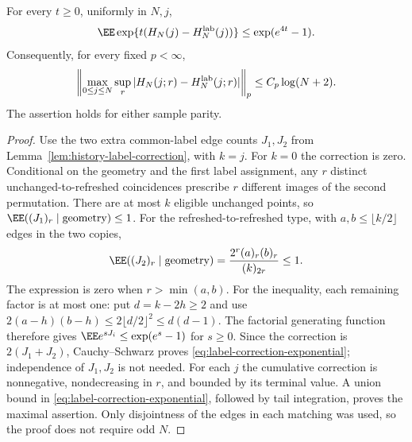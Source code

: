 \documentclass[11pt,letterpaper]{article}
\begin{document}
\begin{lemma}
\label{lem:label-correction-exponential}
For every $t\ge0$, uniformly in $N,j$,
\begin{equation}\label{eq:label-correction-exponential}
 \EE\exp\{t(H_N(j)-H_N^{\rm lab}(j))\}
                       \le \exp(e^{4t}-1).
\end{equation}
Consequently, for every fixed $p<\infty$,
\[
 \left\|\max_{0\le j\le N}\sup_r
       |H_N(j;r)-H_N^{\rm lab}(j;r)|\right\|_p
                              \le C_p\log(N+2).
\]
The assertion holds for either sample parity.
\end{lemma}
\begin{proof}
Use the two extra common-label edge counts $J_1,J_2$
from Lemma~\ref{lem:history-label-correction}, with $k=j$.
For $k=0$ the correction is zero. Conditional on the
geometry and the first label assignment, any $r$ distinct
unchanged-to-refreshed coincidences prescribe $r$ different
images of the second permutation. There are at most $k$
eligible unchanged points, so
$\EE((J_1)_r\mid\text{geometry})\le1$.
For the refreshed-to-refreshed type, with $a,b\le\lfloor k/2\rfloor$
edges in the two copies,
\[
 \EE((J_2)_r\mid\text{geometry})
             =\frac{2^r(a)_r(b)_r}{(k)_{2r}}\le1.
\]
The expression is zero when $r>\min(a,b)$.
For the inequality, each remaining factor is at most one:
put $d=k-2h\ge2$ and use
$2(a-h)(b-h)\le2\lfloor d/2\rfloor^2\le d(d-1)$.
The factorial generating function therefore gives
$\EE e^{sJ_i}\le\exp(e^s-1)$ for $s\ge0$.
Since the correction is $2(J_1+J_2)$, Cauchy--Schwarz
proves \eqref{eq:label-correction-exponential}; independence
of $J_1,J_2$ is not needed.
For each $j$ the cumulative correction is nonnegative,
nondecreasing in $r$, and bounded by its terminal value.
A union bound in \eqref{eq:label-correction-exponential},
followed by tail integration, proves the maximal assertion.
Only disjointness of the edges in each matching was used,
so the proof does not require odd $N$.
\end{proof}
\end{document}
